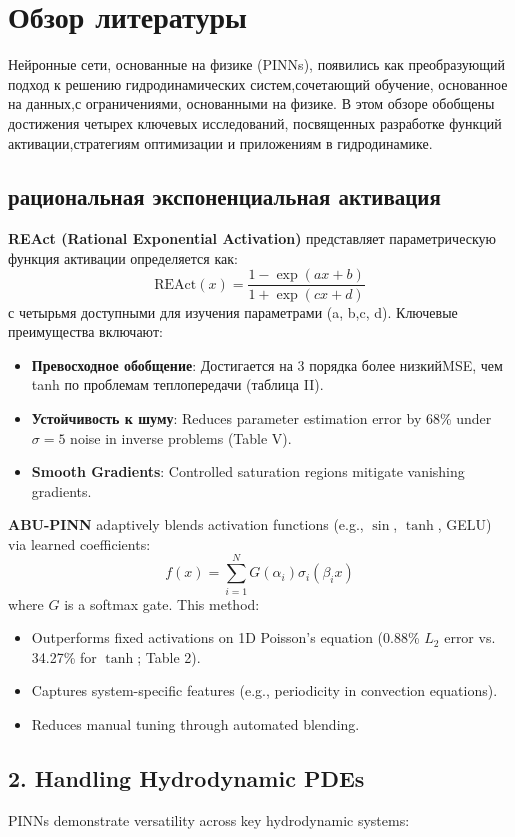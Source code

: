 \section*{Обзор литературы}
Нейронные сети, основанные на физике (PINNs), появились как преобразующий
подход к решению гидродинамических систем,сочетающий обучение, основанное
на данных,с ограничениями, основанными на физике. В этом обзоре обобщены
достижения четырех ключевых исследований, посвященных разработке функций
активации,стратегиям оптимизации и приложениям в гидродинамике.


\subsection{рациональная экспоненциальная активация}
\textbf{REAct (Rational Exponential Activation)} \cite{react} 
представляет параметрическую функция активации определяется как:
\[
\text{REAct}(x) = \frac{1 - \exp(ax + b)}{1 + \exp(cx + d)}
\]
с четырьмя доступными для изучения параметрами (a, b,c, d). Ключевые преимущества включают:
\begin{itemize}
    \item \textbf{Превосходное обобщение}: Достигается на 3 порядка более низкийMSE, чем
    tanh по проблемам теплопередачи (таблица II).
    \item \textbf{Устойчивость к шуму}: Reduces parameter estimation error by 68\% under $\sigma=5$ noise in inverse problems (Table V).
    \item \textbf{Smooth Gradients}: Controlled saturation regions mitigate vanishing gradients.
\end{itemize}

\textbf{ABU-PINN} \cite{abu_pinn} adaptively blends activation functions (e.g., $\sin$, $\tanh$, GELU) via learned coefficients:
\[
f(x) = \sum_{i=1}^N G(\alpha_i) \sigma_i(\beta_i x)
\]
where $G$ is a softmax gate. This method:
\begin{itemize}
    \item Outperforms fixed activations on 1D Poisson's equation (0.88\% $L_2$ error vs. 34.27\% for $\tanh$; Table 2).
    \item Captures system-specific features (e.g., periodicity in convection equations).
    \item Reduces manual tuning through automated blending.
\end{itemize}

\subsection*{2. Handling Hydrodynamic PDEs}
PINNs demonstrate versatility across key hydrodynamic systems:

